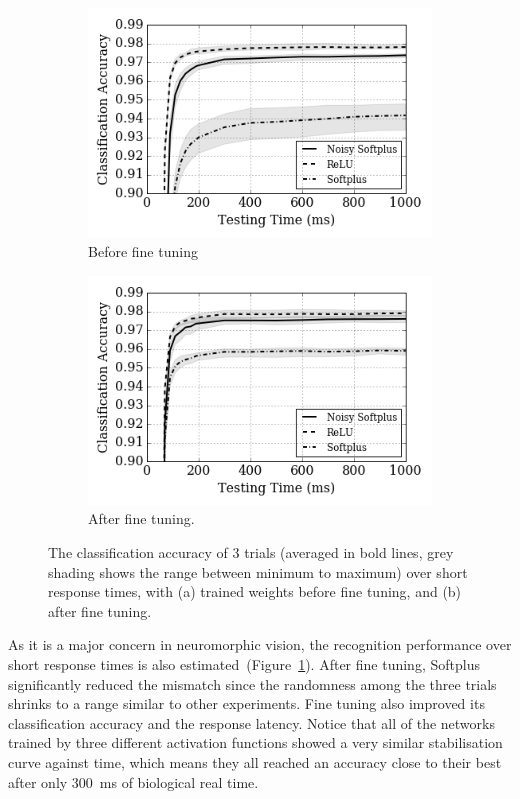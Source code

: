 \documentclass{article}
\begin{document}
\begin{figure}[htb!]
	\centering
	\begin{subfigure}[t]{0.49\textwidth}
		\includegraphics[width=\textwidth]{pics_iconip/8-2.png}
		\caption{Before fine tuning}
	\end{subfigure}
	\begin{subfigure}[t]{0.49\textwidth}
		\includegraphics[width=\textwidth]{pics_iconip/8-3.png}
		\caption{After fine tuning.}
	\end{subfigure}
	
	\caption{The classification accuracy of 3 trials (averaged in bold lines, grey shading shows the range between minimum to maximum) over short response times, with (a) trained weights before fine tuning, and (b) after fine tuning.}
	\label{fig:ca_time}	
\end{figure}

As it is a major concern in neuromorphic vision, the recognition performance over short response times is also estimated~(Figure~\ref{fig:ca_time}).
After fine tuning, Softplus significantly reduced the mismatch since the randomness among the three trials shrinks to a range similar to other experiments.
Fine tuning also improved its classification accuracy and the response latency.
Notice that all of the networks trained by three different activation functions showed a very similar stabilisation curve against time, which means they all reached an accuracy close to their best after only 300~ms of biological real time. 
\end{document}
